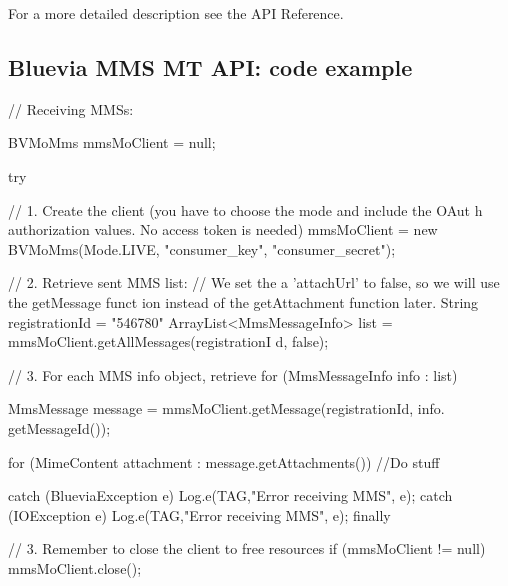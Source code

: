 For a more detailed description see the API Reference.\hypertarget{blv_mms_mo_guide_mms_api_code_example_sec}{}\subsection{Bluevia MMS MT API: code example}\label{blv_mms_mo_guide_mms_api_code_example_sec}

\begin{DoxyCode}
// Receiving MMSs:

BVMoMms mmsMoClient = null;

try {

        // 1. Create the client (you have to choose the mode and include the OAut
      h authorization values. No access token is needed)
        mmsMoClient = new BVMoMms(Mode.LIVE, "consumer_key", "consumer_secret");

        // 2. Retrieve sent MMS list:
        // We set the a 'attachUrl' to false, so we will use the getMessage funct
      ion instead of the getAttachment function later.
        String registrationId = "546780"
        ArrayList<MmsMessageInfo> list = mmsMoClient.getAllMessages(registrationI
      d, false); 
        
        // 3. For each MMS info object, retrieve 
        for (MmsMessageInfo info : list){
                MmsMessage message = mmsMoClient.getMessage(registrationId, info.
      getMessageId());
        
                for (MimeContent attachment : message.getAttachments()){
                        //Do stuff
                }
        
        }

} catch (BlueviaException e) {
        Log.e(TAG,"Error receiving MMS", e);
} catch (IOException e) {
        Log.e(TAG,"Error receiving MMS", e);
} finally {

        // 3. Remember to close the client to free resources
        if (mmsMoClient != null)
                mmsMoClient.close();
} 
\end{DoxyCode}
 